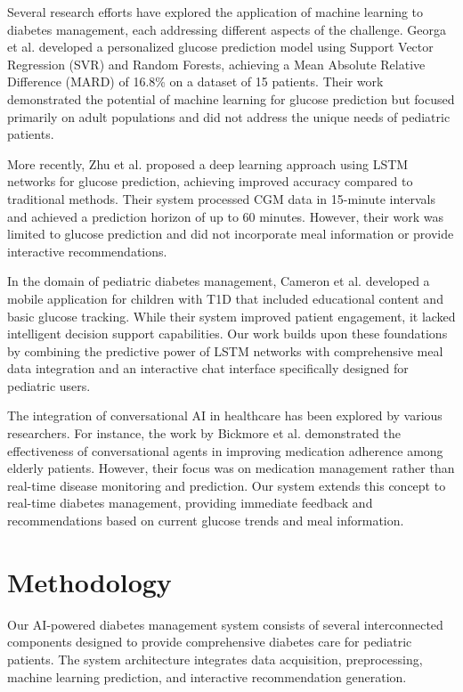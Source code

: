 \documentclass[acmsmall]{acmart}
\begin{document}
Several research efforts have explored the application of machine learning to diabetes management, each addressing different aspects of the challenge. Georga et al. \cite{Georga2013} developed a personalized glucose prediction model using Support Vector Regression (SVR) and Random Forests, achieving a Mean Absolute Relative Difference (MARD) of 16.8\% on a dataset of 15 patients. Their work demonstrated the potential of machine learning for glucose prediction but focused primarily on adult populations and did not address the unique needs of pediatric patients.

More recently, Zhu et al. \cite{Zhu2019} proposed a deep learning approach using LSTM networks for glucose prediction, achieving improved accuracy compared to traditional methods. Their system processed CGM data in 15-minute intervals and achieved a prediction horizon of up to 60 minutes. However, their work was limited to glucose prediction and did not incorporate meal information or provide interactive recommendations.

In the domain of pediatric diabetes management, Cameron et al. \cite{Cameron2018} developed a mobile application for children with T1D that included educational content and basic glucose tracking. While their system improved patient engagement, it lacked intelligent decision support capabilities. Our work builds upon these foundations by combining the predictive power of LSTM networks with comprehensive meal data integration and an interactive chat interface specifically designed for pediatric users.

The integration of conversational AI in healthcare has been explored by various researchers. For instance, the work by Bickmore et al. \cite{Bickmore2018} demonstrated the effectiveness of conversational agents in improving medication adherence among elderly patients. However, their focus was on medication management rather than real-time disease monitoring and prediction. Our system extends this concept to real-time diabetes management, providing immediate feedback and recommendations based on current glucose trends and meal information.

\section{Methodology}

Our AI-powered diabetes management system consists of several interconnected components designed to provide comprehensive diabetes care for pediatric patients. The system architecture integrates data acquisition, preprocessing, machine learning prediction, and interactive recommendation generation.
\end{document}
